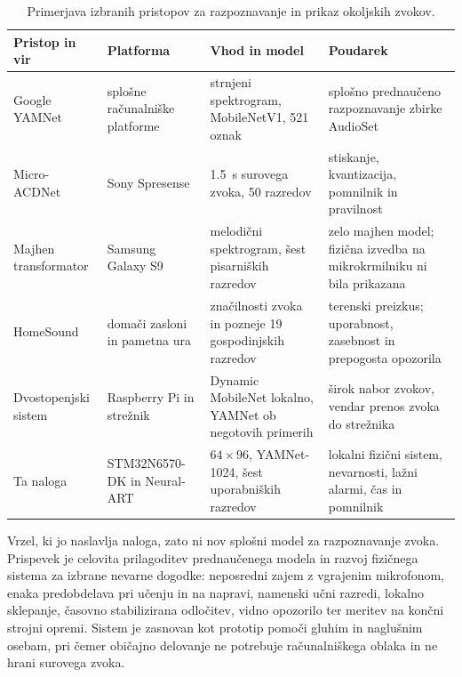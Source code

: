 \begin{table}[htbp]
  \centering
  \caption{Primerjava izbranih pristopov za razpoznavanje in prikaz okoljskih zvokov.}
  \label{tab:sorodna-dela}
  \scriptsize
  \setlength{\tabcolsep}{5pt}
  \renewcommand{\arraystretch}{1.3}
  \begin{tabular}{@{}>{\raggedright\arraybackslash}p{}
                   >{\raggedright\arraybackslash}p{}
                   >{\raggedright\arraybackslash}p{}
                   >{\raggedright\arraybackslash}p{}@{}}
    \toprule
    Pristop in vir & Platforma & Vhod in model & Poudarek \\
    \midrule
    Google YAMNet \cite{tensorflowyamnetrepo}
      & splošne računalniške platforme 
      & strnjeni spektrogram, MobileNetV1, 521 oznak 
      & splošno prednaučeno razpoznavanje zbirke AudioSet \\
    \addlinespace
    
    Micro-ACDNet \cite{mohaimenuzzaman2023edge}
      & Sony Spresense 
      & \SI{1.5}{\second} surovega zvoka, 50 razredov 
      & stiskanje, kvantizacija, pomnilnik in pravilnost \\
    \addlinespace
    
    Majhen transformator \cite{elliott2021tiny}
      & Samsung Galaxy S9 
      & melodični spektrogram, šest pisarniških razredov 
      & zelo majhen model; fizična izvedba na mikrokrmilniku ni bila prikazana \\
    \addlinespace
    
    HomeSound \cite{jain2020homesound}
      & domači zasloni in pametna ura 
      & značilnosti zvoka in pozneje 19 gospodinjskih razredov 
      & terenski preizkus; uporabnost, zasebnost in prepogosta opozorila \\
    \addlinespace
    
    Dvostopenjski sistem \cite{lin2026indoor}
      & Raspberry Pi in strežnik 
      & Dynamic MobileNet lokalno, YAMNet ob negotovih primerih 
      & širok nabor zvokov, vendar prenos zvoka do strežnika \\
    \addlinespace
    
    Ta naloga 
      & STM32N6570-DK in Neural-ART 
      & $64\times96$, YAMNet-1024, šest uporabniških razredov 
      & lokalni fizični sistem, nevarnosti, lažni alarmi, čas in pomnilnik \\
    \bottomrule
  \end{tabular}
\end{table}

Vrzel, ki jo naslavlja naloga, zato ni nov splošni model za razpoznavanje zvoka.
Prispevek je celovita prilagoditev prednaučenega modela in razvoj fizičnega
sistema za izbrane nevarne dogodke: neposredni zajem z vgrajenim mikrofonom,
enaka predobdelava pri učenju in na napravi, namenski učni razredi, lokalno
sklepanje, časovno stabilizirana odločitev, vidno opozorilo ter meritev na
končni strojni opremi. Sistem je zasnovan kot prototip pomoči gluhim in
naglušnim osebam, pri čemer običajno delovanje ne potrebuje računalniškega
oblaka in ne hrani surovega zvoka.